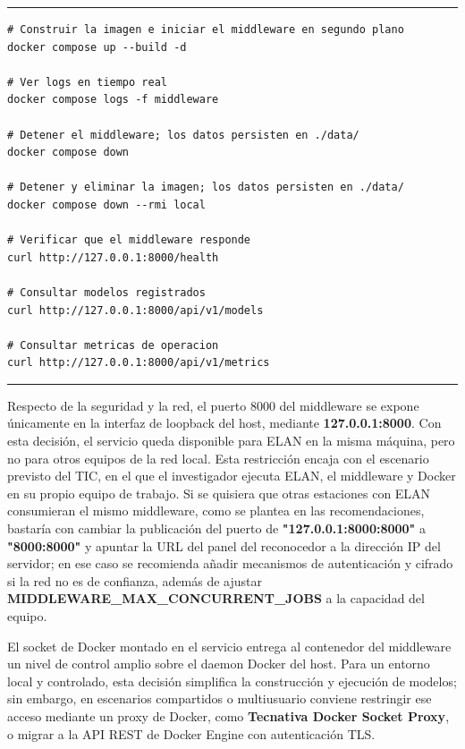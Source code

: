 \documentclass[11pt,a4paper]{article}
\begin{document}
\begin{center}
\begin{minipage}{0.90\textwidth}
\hrule
\vspace{0.06cm}
\scriptsize
\begin{Verbatim}[baselinestretch=0.72]
# Construir la imagen e iniciar el middleware en segundo plano
docker compose up --build -d

# Ver logs en tiempo real
docker compose logs -f middleware

# Detener el middleware; los datos persisten en ./data/
docker compose down

# Detener y eliminar la imagen; los datos persisten en ./data/
docker compose down --rmi local

# Verificar que el middleware responde
curl http://127.0.0.1:8000/health

# Consultar modelos registrados
curl http://127.0.0.1:8000/api/v1/models

# Consultar metricas de operacion
curl http://127.0.0.1:8000/api/v1/metrics
\end{Verbatim}
\vspace{0.03cm}
\hrule

\label{fig:compose_cmds}
\end{minipage}
\end{center}

Respecto de la seguridad y la red, el puerto 8000 del middleware se expone únicamente en la interfaz de loopback del host, mediante \textbf{127.0.0.1:8000}. Con esta decisión, el servicio queda disponible para ELAN en la misma máquina, pero no para otros equipos de la red local. Esta restricción encaja con el escenario previsto del TIC, en el que el investigador ejecuta ELAN, el middleware y Docker en su propio equipo de trabajo. Si se quisiera que otras estaciones con ELAN consumieran el mismo middleware, como se plantea en las recomendaciones, bastaría con cambiar la publicación del puerto de \textbf{"127.0.0.1:8000:8000"} a \textbf{"8000:8000"} y apuntar la URL del panel del reconocedor a la dirección IP del servidor; en ese caso se recomienda añadir mecanismos de autenticación y cifrado si la red no es de confianza, además de ajustar \textbf{MIDDLEWARE\_MAX\_CONCURRENT\_JOBS} a la capacidad del equipo.

El socket de Docker montado en el servicio entrega al contenedor del middleware un nivel de control amplio sobre el daemon Docker del host. Para un entorno local y controlado, esta decisión simplifica la construcción y ejecución de modelos; sin embargo, en escenarios compartidos o multiusuario conviene restringir ese acceso mediante un proxy de Docker, como \textbf{Tecnativa Docker Socket Proxy}, o migrar a la API REST de Docker Engine con autenticación TLS.
\end{document}
